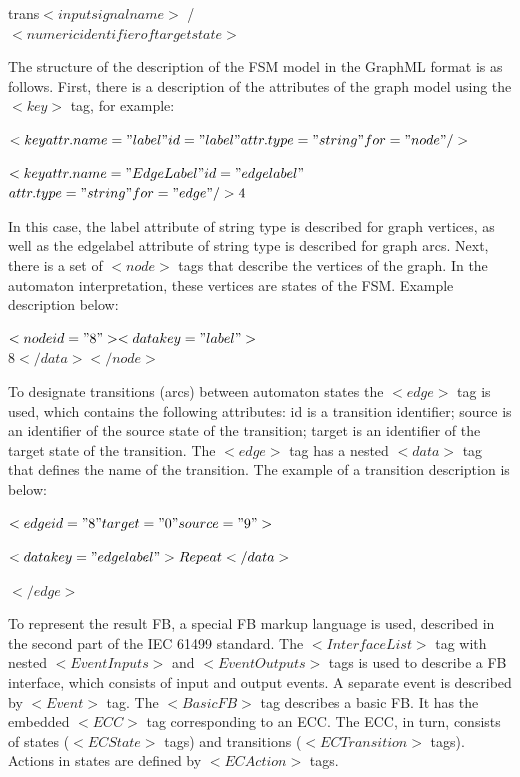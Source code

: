 \begin{bibunit}
trans{$<input signal name>$ / \\ $< numeric identifier of target state>$}

The structure of the description of the FSM model in the GraphML format is as follows. First, there is a description of the attributes of the graph model using the $<key>$ tag, for example:

$<key attr.name="label" id="label" attr.type="string" for="node"/>$

$<key attr.name="Edge Label" id="edgelabel" $\\$ attr.type="string" for="edge"/>4$

In this case, the label attribute of string type is described for graph vertices, as well as the edgelabel attribute of string type is described for graph arcs. Next, there is a set of $<node>$ tags that describe the vertices of the graph. In the automaton interpretation, these vertices are states of the FSM. Example description below:

$<node id="8"><data key="label">$\\$8</data></node>$

To designate transitions (arcs) between automaton states the $<edge>$ tag is used, which contains the following attributes: id is a transition identifier; source is an identifier of the source state of the transition; target is an identifier of the target state of the transition. The $<edge>$ tag has a nested $<data>$ tag that defines the name of the transition. The example of a transition description is below:

$<edge id="8" target="0" source="9">$

$<data key="edgelabel">Repeat</data>$

$</edge>$

To represent the result FB, a special FB markup language is used, described in the second part of the IEC 61499 standard. The $<InterfaceList>$ tag with nested $<EventInputs>$ and $<EventOutputs>$ tags is used to describe a FB interface, which consists of input and output events. A separate event is described by $<Event>$ tag. The $<BasicFB>$ tag describes a basic FB. It has the embedded $<ECC>$ tag corresponding to
an ECC. The ECC, in turn, consists of states ($<ECState>$ tags) and transitions ($<ECTransition>$ tags). Actions in states are defined by $<ECAction>$ tags.

\end{bibunit}
